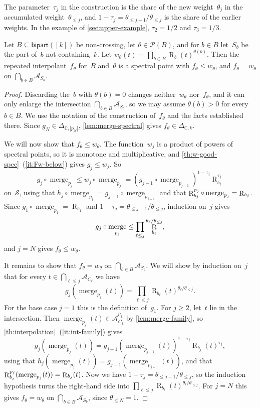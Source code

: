 \documentclass[11pt,letterpaper]{article}
\DeclareMathOperator{\tensorrank}{R}
\DeclareMathOperator{\merge}{merge}
\newcommand{\bipart}{\mathsf{bipart}}
\newcommand{\CC}{\mathbb{C}}
\begin{document}
The parameter~$\tau_j$ in the construction is the share of the new weight~$\theta_j$ in the accumulated weight~$\theta_{\leq j}$, and $1 - \tau_j = \theta_{\leq j-1}/\theta_{\leq j}$ is the share of the earlier weights. In the example of \cref{sec:upper-example}, $\tau_2 = 1/2$ and $\tau_3 = 1/3$.
\begin{theorem}\label{th:refine}
Let $B \subseteq \bipart([k])$ be non-crossing, let $\theta \in \mathcal{P}(B)$, and for $b \in B$ let~$S_b$ be the part of~$b$ not containing~$k$. Let $w_\theta(t) = \prod_{b \in B} \tensorrank_b(t)^{\theta(b)}$. Then the repeated interpolant~$f_\theta$ for~$B$ and~$\theta$ is a spectral point with $f_\theta \leq w_\theta$, and $f_\theta = w_\theta$ on $\bigcap_{b \in B} \mathcal{A}_{S_b}$.
\end{theorem}
\begin{proof}
Discarding the~$b$ with $\theta(b) = 0$ changes neither~$w_\theta$ nor~$f_\theta$, and it can only enlarge the intersection $\bigcap_{b \in B} \mathcal{A}_{S_b}$, so we may assume $\theta(b) > 0$ for every $b \in B$. We use the notation of the construction of~$f_\theta$ and the facts established there. Since $g_N \in \Delta_{\CC,|p_N|}$, \cref{lem:merge-spectral} gives $f_\theta \in \Delta_{\CC,k}$.

We will now show that $f_\theta \leq w_\theta$. The function~$w_j$ is a product of powers of spectral points, so it is monotone and multiplicative, and \cref{th:w-good-spec}~(\ref{it:Fw-below}) gives $g_j \leq w_j$. So 
\[
g_j \circ \merge_{p_j} \leq w_j \circ \merge_{p_j} = (g_{j-1} \circ \merge_{p_{j-1}})^{1-\tau_j} \tensorrank_{b_j}^{\tau_j}
\]
on~$\mathcal{S}$, using that $h_j \circ \merge_{p_j} = g_{j-1} \circ \merge_{p_{j-1}}$ and that $\tensorrank^{p_j}_{\smash[b]{b_j}} \circ \merge_{p_j} = \tensorrank_{b_j}$. Since $g_1 \circ \merge_{p_1} = \tensorrank_{b_1}$ and $1 - \tau_j = \theta_{\leq j-1}/\theta_{\leq j}$, induction on~$j$ gives
\[
g_j \circ \merge_{p_j} \leq \prod_{\mathclap{\ell \leq j}} \tensorrank_{b_\ell}^{\theta_\ell/\theta_{\leq j}},
\]
and $j = N$ gives $f_\theta \leq w_\theta$.

It remains to show that $f_\theta = w_\theta$ on $\bigcap_{b \in B} \mathcal{A}_{S_b}$. We will show by induction on~$j$ that for every $t \in \bigcap_{\ell \leq j} \mathcal{A}_{C_\ell}$ we have
\[
g_j(\merge_{p_j}(t)) = \prod_{\ell \leq j} \tensorrank_{b_\ell}(t)^{\theta_\ell / \theta_{\leq j}}.
\]
For the base case $j = 1$ this is the definition of~$g_1$. For $j \geq 2$, let~$t$ lie in the intersection. Then $\merge_{p_j}(t) \in \mathcal{A}^{p_j}_{C_j}$ by \cref{lem:merge-family}, so \cref{th:interpolation}~(\ref{it:int-family}) gives
\[
g_j(\merge_{p_j}(t)) = g_{j-1}(\merge_{p_{j-1}}(t))^{1 - \tau_j} \tensorrank_{b_j}(t)^{\tau_j},
\]
using that $h_j(\merge_{p_j}(t)) = g_{j-1}(\merge_{p_{j-1}}(t))$, and that $\tensorrank^{p_j}_{\smash[b]{b_j}}(\merge_{p_j}(t)) = \tensorrank_{b_j}(t)$. Now we have $1 - \tau_j = \theta_{\leq j-1}/\theta_{\leq j}$, so the induction hypothesis turns the right-hand side into $\prod_{\ell \leq j} \tensorrank_{b_\ell}(t)^{\theta_\ell / \theta_{\leq j}}$. For $j = N$ this gives $f_\theta = w_\theta$ on $\bigcap_{b \in B} \mathcal{A}_{S_b}$, since $\theta_{\leq N} = 1$.
\end{proof}
\end{document}
